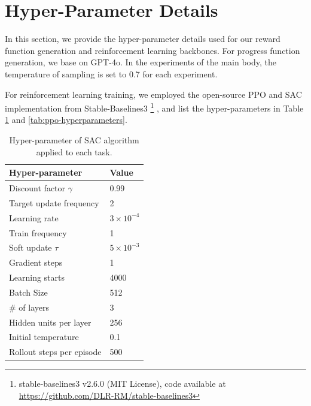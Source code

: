 \section{Hyper-Parameter Details}\label{app:hyperparameters}
In this section, we provide the hyper-parameter details used for our reward function generation and reinforcement learning backbones. For progress function generation, we base on GPT-4o. In the experiments of the main body, the temperature of sampling is set to 0.7 for each experiment.

For reinforcement learning training, we employed the open-source PPO\cite{schulman2017proximal} and SAC implementation\cite{haarnoja2018softactorcriticoffpolicymaximum} from Stable-Baselines3\cite{stable-baselines3}
\footnote{stable-baselines3 v2.6.0 (MIT License), code available at \url{https://github.com/DLR-RM/stable-baselines3}}
, and list the hyper-parameters in Table \ref{tab:sac-hyperparameters} and \ref{tab:ppo-hyperparameters}.

\begin{table}[h]
\caption{Hyper-parameter of SAC algorithm applied to each task.}
\label{tab:sac-hyperparameters}
\centering
\begin{tabular}{ll}
\toprule
\textbf{Hyper-parameter}         & \textbf{Value}                                              \\
\midrule
Discount factor \( \gamma \)     & 0.99                       \\
Target update frequency          & 2                            \\
Learning rate                    & \( 3 \times 10^{-4} \)                     \\
Train frequency                  & 1                              \\
Soft update \( \tau \)           & \( 5 \times 10^{-3} \)                                      \\
Gradient steps                   & 1                           \\
Learning starts                  & 4000                                                       \\
Batch Size                       & 512                        \\
\# of layers                      & 3                             \\
Hidden units per layer           & 256                                                        \\
Initial temperature              & 0.1                       \\
Rollout steps per episode        & 500                         \\
\bottomrule
\end{tabular}
\end{table}

